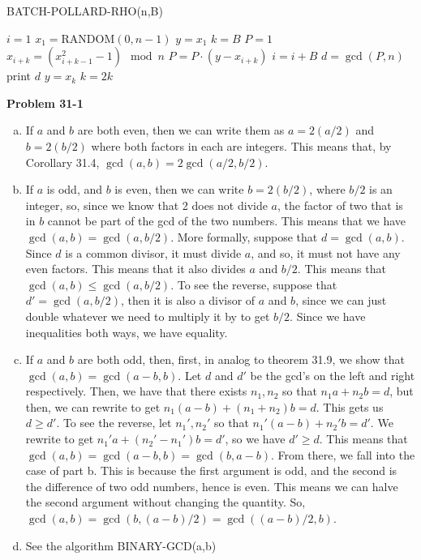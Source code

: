 \documentclass{article}
\begin{document}
\begin{algorithm}
\caption{BATCH-POLLARD-RHO(n,B)}
\begin{algorithmic}
\State $i=1$
\State $x_1 = \text{RANDOM}(0,n-1)$
\State $y=x_1$
\State $k=B$
\State $P = 1$
\State $x_{i+k} = (x_{i+k-1}^2-1) \mod n$
\State $P = P \cdot (y- x_{i+k})$
\EndFor
\State $i = i+B$
\State $d = \gcd(P,n)$
\State print $d$
\EndIf
{}
\State $y = x_k$
\State $k = 2k$
\EndIf
\EndWhile
\end{algorithmic}
\end{algorithm}


\noindent\textbf{Problem 31-1}\\

\begin{enumerate}[a.]
\item If $a$ and $b$ are both even, then we can write them as $a = 2 (a/2)$ and $b=2(b/2)$ where both factors in each are integers. This means that, by Corollary 31.4, $\gcd(a,b) = 2 \gcd(a/2,b/2)$.
\item If $a$ is odd, and $b$ is even, then we can write $b = 2 (b/2)$, where $b/2$ is an integer, so, since we know that 2 does not divide $a$, the factor of two that is in $b$ cannot be part of the gcd of the two numbers. This means that we have $\gcd(a,b) = \gcd(a,b/2)$. More formally, suppose that $d= \gcd(a,b)$. Since $d$ is a common divisor, it must divide $a$, and so, it must not have any even factors. This means that it also divides $a$ and $b/2$. This means that $\gcd(a,b) \le \gcd(a,b/2)$. To see the reverse, suppose that $d' = \gcd(a,b/2)$, then it is also a divisor of $a$ and $b$, since we can just double whatever we need to multiply it by to get $b/2$. Since we have inequalities both ways, we have equality.
\item
If $a$ and $b$ are both odd, then, first, in analog to theorem 31.9, we show that $\gcd(a,b) = \gcd(a-b,b)$. Let $d$ and $d'$ be the gcd's on the left and right respectively. Then, we have that there exists $n_1,n_2$ so that $n_1 a + n_2 b = d$, but then, we can rewrite to get $n_1( a- b) + (n_1+n_2)b = d$. This gets us $d \ge d'$. To see the reverse, let $n_1',n_2'$ so that $n_1' (a-b) + n_2' b = d'$. We rewrite to get $n_1' a + (n_2' - n_1') b = d'$, so we have $d'\ge d$. This means that $\gcd(a,b) = \gcd(a-b,b) = \gcd(b,a-b)$. From there, we fall into the case of part b. This is because the first argument is odd, and the second is the difference of two odd numbers, hence is even. This means we can halve the second argument without changing the quantity. So, $\gcd(a,b) = \gcd(b, (a-b)/2) =\gcd((a-b)/2,b)$.
\item
See the algorithm BINARY-GCD(a,b)


\end{enumerate}
\end{document}
